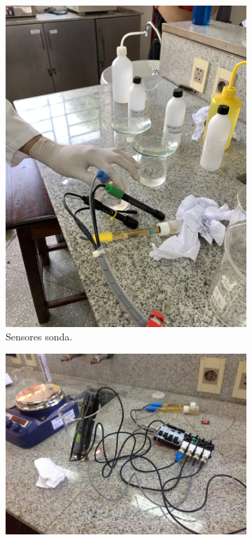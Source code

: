\begin{figure}
     \centering
     \begin{subfigure}[b]{0.25\textwidth}
         \centering
         \includegraphics[angle=270,width=\textwidth]{Imagenes/cap4/qca1.jpg}
         \caption{Sensores sonda.}
         \label{fig:calibracionLSD}
     \end{subfigure}
     \hfill
     \begin{subfigure}[b]{0.4\textwidth}
         \centering
         \includegraphics[width=\textwidth]{Imagenes/cap4/qca2.jpg}

\end{subfigure}
\end{figure}
